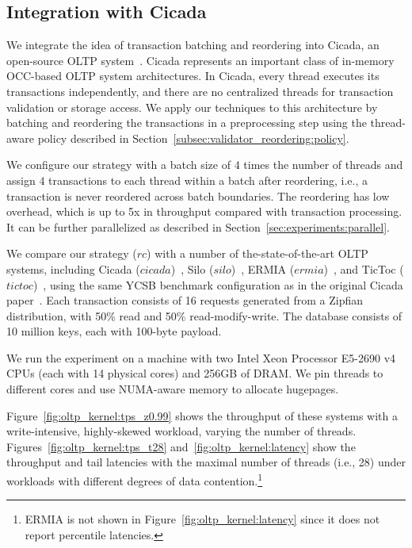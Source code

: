 \subsection{Integration with Cicada}
\label{sec:exp:cicada}
We integrate the idea of transaction batching and reordering into Cicada, an open-source OLTP system~\cite{lim2017cicada}. Cicada represents an important class of in-memory OCC-based OLTP system architectures. In Cicada, every thread executes its transactions independently, and there are no centralized threads for transaction validation or storage access. We apply our techniques to this architecture by batching and reordering the transactions in a preprocessing step using the thread-aware policy described in Section~\ref{subsec:validator_reordering:policy}. 

We configure our strategy with a batch size of $4$ times the number of threads and assign $4$ transactions to each thread within a batch after reordering, i.e., a transaction is never reordered across batch boundaries. The reordering has low overhead, which is up to 5x in throughput compared with transaction processing. It can be further parallelized as described in Section~\ref{sec:experiments:parallel}.

We compare our strategy ($rc$) with a number of the-state-of-the-art OLTP systems, including Cicada ($cicada$)~\cite{lim2017cicada}, Silo ($silo$)~\cite{tu2013speedy}, ERMIA ($ermia$)~\cite{kim2016ermia}, and TicToc ($tictoc$)~\cite{yu2016tictoc}, using the same YCSB benchmark configuration as 
in the original Cicada paper~\cite{lim2017cicada}. Each transaction consists of 16 requests generated from a Zipfian distribution, with 50\% read and 50\% read-modify-write. The database consists of 10 million keys, each with 100-byte payload.

We run the experiment on a machine with two Intel Xeon Processor E5-2690 v4 CPUs (each with 14 physical cores) and 256GB of DRAM. We pin threads to different cores and use NUMA-aware memory to allocate hugepages.

Figure~\ref{fig:oltp_kernel:tps_z0.99} shows the throughput of these systems with a write-intensive, highly-skewed workload, varying the number of threads. Figures~\ref{fig:oltp_kernel:tps_t28} and~\ref{fig:oltp_kernel:latency} show the throughput and tail latencies with the maximal number of threads (i.e., 28) under workloads with different degrees of data contention.\footnote{ERMIA is not shown in Figure~\ref{fig:oltp_kernel:latency} since it does not report percentile latencies.} 

